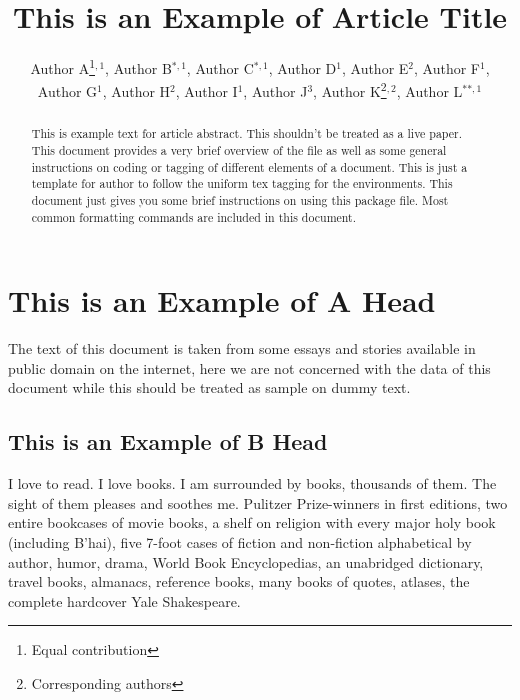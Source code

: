 \documentclass[manuscript]{clv2025}
\begin{document}
\title{This is an Example of Article Title}

\author{Author A\thanks{Equal contribution}$^{,1}$, Author B$^{*,1}$, Author C$^{*,1}$, Author D$^{1}$, Author E$^{2}$, Author F$^{1}$, Author G$^{1}$, Author H$^{2}$, Author I$^{1}$, Author J$^{3}$, Author K\thanks{Corresponding authors}$^{,2}$, Author L$^{**,1}$}


\maketitle

\begin{abstract}
This is example text for article abstract. This shouldn't be treated as a live paper. This document provides a very brief overview of the file as well as some general instructions on coding or tagging of different elements of a document. This is just a template for author to follow the uniform tex tagging for the environments. This document just gives you some brief instructions on using this package file. Most common formatting commands are included in this document.
\end{abstract}

\section{This is an Example of A Head}

The text of this document is taken from some essays and stories available in public domain on the internet, here we are not concerned with the data of this document while this should be treated as sample on dummy text.

\subsection{This is an Example of B Head}

I love to read. I love books. I am surrounded by books, thousands of them. The sight of them pleases and soothes me. Pulitzer Prize-winners in first editions, two entire bookcases of movie books, a shelf on religion with every major holy book (including B'hai), five 7-foot cases of fiction and non-fiction alphabetical by author, humor, drama, World Book Encyclopedias, an unabridged dictionary, travel books, almanacs, reference books, many books of quotes, atlases, the complete hardcover Yale Shakespeare.
\end{document}
